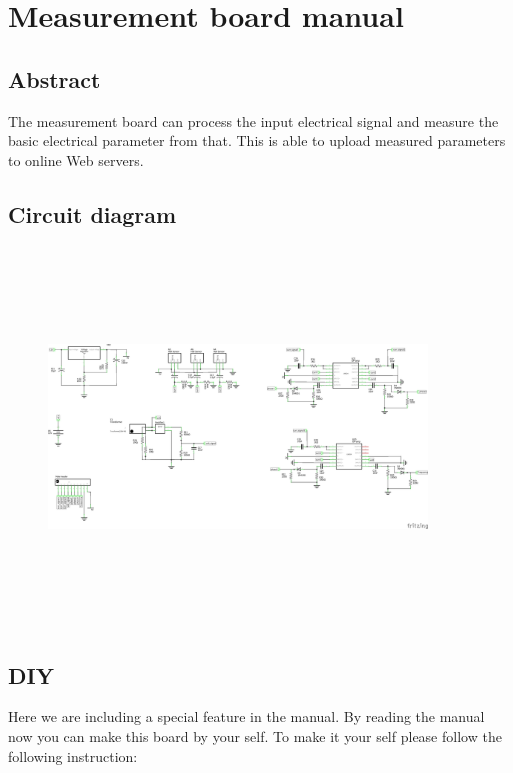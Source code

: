 \documentclass[a4paper,12pt,oneside]{book}
\begin{document}
\chapter[Measurement board manual]{Measurement board manual}
\label{100}
\section{Abstract}
\hspace{7mm} The measurement board can process the input electrical signal and measure the basic electrical parameter from that. This is able to upload measured parameters to online Web servers.

\newpage
\section{Circuit diagram}
\begin{figure}[h]
	\includegraphics[width=380px,height=380px]{schematic}
\end{figure}
\newpage
\section{DIY}
Here we are including a special feature in the manual. By reading the manual now you can make this board by your self. To make it your self please follow the following instruction:
\end{document}
